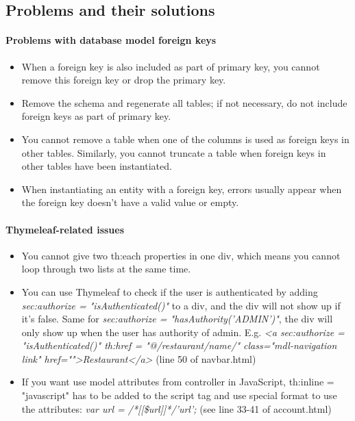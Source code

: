 \documentclass[12pt]{article}
\begin{document}
\subsection{Problems and their solutions}
\paragraph{Problems with database model foreign keys}
\begin{itemize}
	\item When a foreign key is also included as part of primary key, you cannot remove this foreign key or drop the primary key.
	\item Remove the schema and regenerate all tables; if not necessary, do not include foreign keys as part of primary key.
	\item You cannot remove a table when one of the columns is used as foreign keys in other tables. Similarly, you cannot truncate a table when foreign keys in other tables have been instantiated.
	\item When instantiating an entity with a foreign key, errors usually appear when the foreign key doesn't have a valid value or empty.
\end{itemize}

\paragraph{Thymeleaf-related issues}
\begin{itemize}
	\item You cannot give two th:each properties in one div, which means you cannot loop through two lists at the same time.
	\item You can use Thymeleaf to check if the user is authenticated by adding \textit{sec:authorize = "isAuthenticated()"} to a div, and the div will not show up if it’s false. Same for \textit{sec:authorize = "hasAuthority('ADMIN')"}, the div will only show up when the user has authority of admin. E.g. \textit{<a sec:authorize = "isAuthenticated()" th:href = "@{/restaurant/name/}" class="mdl-navigation  link" href="">Restaurant</a>} (line 50 of navbar.html)
	\item If you want use model attributes from controller in JavaScript, th:inline = "javascript" has to be added to the script tag and use special format to use the attributes: \textit{var url = /*[[\${url}]]*/'url';} (see line 33-41 of account.html)
\end{itemize}
\end{document}
